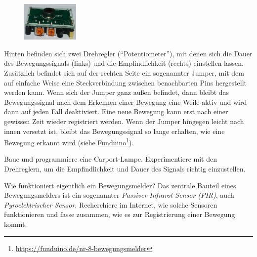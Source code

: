 \begin{figure}
	\centering
	\vspace{-0.75\baselineskip}
	\includegraphics[width=0.25\textwidth]{pics/bewegungsmelder-hinten.jpg}
	\vspace{-\baselineskip}
	\label{abb:bewegungsmelder-hinten}
\end{figure}
Hinten befinden sich zwei Drehregler (\enquote{Potentiometer}), mit denen sich die Dauer des Bewegungssignals (links) und die Empfindlichkeit (rechts) einstellen lassen. Zusätzlich befindet sich auf der rechten Seite ein sogenannter Jumper, mit dem auf einfache Weise eine Steckverbindung zwischen benachbarten Pins hergestellt werden kann. Wenn sich der Jumper ganz außen befindet, dann bleibt das Bewegungssignal nach dem Erkennen einer Bewegung eine Weile aktiv und wird dann auf jeden Fall deaktiviert. Eine neue Bewegung kann erst nach einer gewissen Zeit wieder registriert werden. Wenn der Jumper hingegen leicht nach innen versetzt ist, bleibt das Bewegungssignal so lange erhalten, wie eine Bewegung erkannt wird (siehe \href{https://funduino.de/nr-8-bewegungsmelder}{Funduino}\footnote{\url{https://funduino.de/nr-8-bewegungsmelder}}).

\begin{projekt}\label{proj:carport}
	Baue und programmiere eine Carport-Lampe. Experimentiere mit den Drehreglern, um die Empfindlichkeit und Dauer des Signals richtig einzustellen.
\end{projekt}

\begin{recherche}{Wie funktioniert eigentlich ein Bewegungsmelder?}
	Das zentrale Bauteil eines Bewegungsmelders ist ein sogenannter \emph{Passiver Infrarot Sensor (PIR)}, auch \emph{Pyroelektrischer Sensor}. Recherchiere im Internet, wie solche Sensoren funktionieren und fasse zusammen, wie es zur Registrierung einer Bewegung kommt.	
\end{recherche}

\newpage
{}
\onehalfspacing
